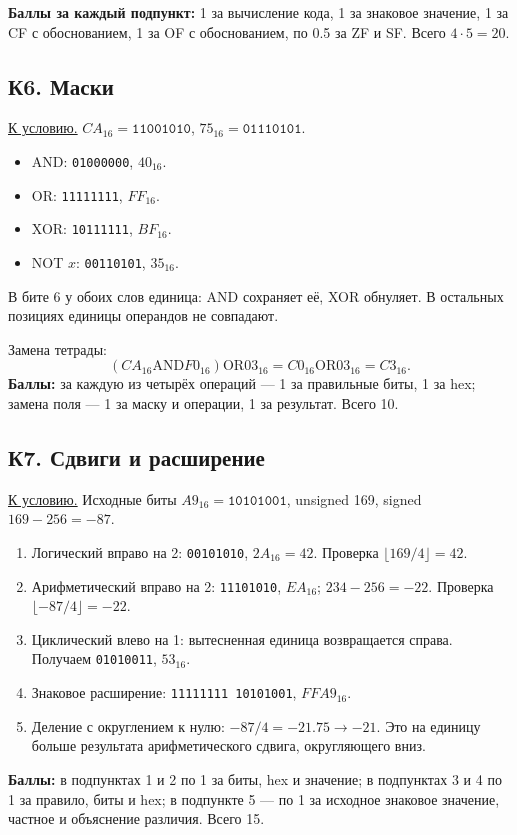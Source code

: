 \textbf{Баллы за каждый подпункт:} 1 за вычисление кода, 1 за знаковое значение, 1 за CF с обоснованием, 1 за OF с обоснованием, по 0.5 за ZF и SF. Всего $4\cdot5=20$.

\subsection*{К6. Маски}\label{sol:k6}
\hyperref[task:k6]{К условию.}
$CA_{16}=\texttt{11001010}$, $75_{16}=\texttt{01110101}$.
\begin{itemize}
    \item AND: \texttt{01000000}, $40_{16}$.
    \item OR: \texttt{11111111}, $FF_{16}$.
    \item XOR: \texttt{10111111}, $BF_{16}$.
    \item NOT $x$: \texttt{00110101}, $35_{16}$.
\end{itemize}
В бите 6 у обоих слов единица: AND сохраняет её, XOR обнуляет. В остальных позициях единицы операндов не совпадают.

Замена тетрады:
\[
(CA_{16}\mathbin{\mathrm{AND}}F0_{16})\mathbin{\mathrm{OR}}03_{16}
=C0_{16}\mathbin{\mathrm{OR}}03_{16}=C3_{16}.
\]
\textbf{Баллы:} за каждую из четырёх операций --- 1 за правильные биты, 1 за hex; замена поля --- 1 за маску и операции, 1 за результат. Всего 10.

\subsection*{К7. Сдвиги и расширение}\label{sol:k7}
\hyperref[task:k7]{К условию.}
Исходные биты $A9_{16}=\texttt{10101001}$, unsigned 169, signed $169-256=-87$.
\begin{enumerate}
    \item Логический вправо на 2: \texttt{00101010}, $2A_{16}=42$. Проверка $\lfloor169/4\rfloor=42$.
    \item Арифметический вправо на 2: \texttt{11101010}, $EA_{16}$; $234-256=-22$. Проверка $\lfloor-87/4\rfloor=-22$.
    \item Циклический влево на 1: вытесненная единица возвращается справа. Получаем \texttt{01010011}, $53_{16}$.
    \item Знаковое расширение: \texttt{11111111 10101001}, $FFA9_{16}$.
    \item Деление с округлением к нулю: $-87/4=-21.75\longrightarrow-21$. Это на единицу больше результата арифметического сдвига, округляющего вниз.
\end{enumerate}
\textbf{Баллы:} в подпунктах 1 и 2 по 1 за биты, hex и значение; в подпунктах 3 и 4 по 1 за правило, биты и hex; в подпункте 5 --- по 1 за исходное знаковое значение, частное и объяснение различия. Всего 15.

